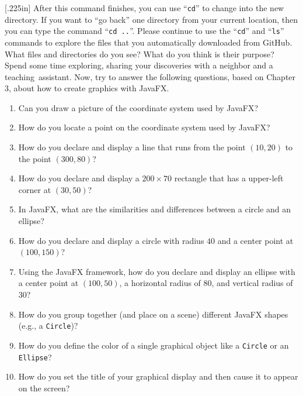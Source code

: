 \documentclass[11pt]{article}
\newcommand{\command}[1]{``\lstinline{#1}''}
\newcommand{\program}[1]{\lstinline{#1}}
\newcommand{\step}[1]{``{#1}''}
\newcommand{\discuss}[1]{\null\hfill\LARGE{\faCommentO{}}\newline\scriptsize{\em{#1}}}
\begin{document}
\marginnote{\discuss{Discuss graphics code}}[.225in] After this command
finishes, you can use \command{cd} to change into the new directory. If you want
to \step{go back} one directory from your current location, then you can type
the command \command{cd ..}. Please continue to use the \command{cd} and
\command{ls} commands to explore the files that you automatically downloaded
from GitHub. What files and directories do you see? What do you think is their
purpose? Spend some time exploring, sharing your discoveries with a neighbor and
a \mbox{teaching assistant}. Now, try to answer the following questions, based
on Chapter 3, about how to create graphics with JavaFX.

\begin{enumerate}

  \setlength{\itemsep}{0pt}

  \item Can you draw a picture of the coordinate system used by JavaFX?

  \item How do you locate a point on the coordinate system used by JavaFX?

  \item How do you declare and display a line that runs from the point $(10,
    20)$ to the point $(300, 80)$?

  \item How do you declare and display a $200 \times 70$ rectangle that has
    a upper-left corner at $(30, 50)$?

  \item In JavaFX, what are the similarities and differences between a circle
    and an ellipse?

  \item How do you declare and display a circle with radius $40$ and a center
    point at $(100, 150)$?

  \item Using the JavaFX framework, how do you declare and display an ellipse
    with a center point at $(100, 50)$, a horizontal radius of $80$, and
    vertical radius of $30$?

  \item How do you group together (and place on a scene) different JavaFX shapes
    (e.g., a \program{Circle})?

  \item How do you define the color of a single graphical object like a
    \program{Circle} or an \program{Ellipse}?

  \item How do you set the title of your graphical display and then cause it to
    appear on the screen?

\end{enumerate}
\end{document}

